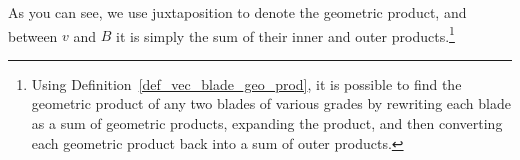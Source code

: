 \documentclass[12pt]{article}
\numberwithin{equation}{section}
\begin{document}
As you can see, we use juxtaposition to denote the geometric product, and
between $v$ and $B$ it is simply the sum of their inner and outer products.\footnote{Using
Definition~\ref{def_vec_blade_geo_prod}, it is possible to find the geometric
product of any two blades of various grades by rewriting each blade as a sum of geometric products,
expanding the product, and then converting each geometric product back into a
sum of outer products.} %








\end{document}
